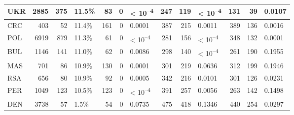 \begin{tabular}{l|r|r|l|r|r|l|r|r|l|r|r|l}
\hline
UKR & 2885 & 375 & 11.5\% & 83 & 0 & < 10\textsuperscript{--4} & 247 & 119 & < 10\textsuperscript{--4} & 131 & 39 & 0.0107\\
\hline
CRC & 403 & 52 & 11.4\% & 161 & 0 & 0.0001 & 387 & 215 & 0.0011 & 389 & 136 & 0.0016\\
\hline
POL & 6919 & 879 & 11.3\% & 61 & 0 & < 10\textsuperscript{--4} & 281 & 156 & < 10\textsuperscript{--4} & 348 & 132 & 0.0001\\
\hline
BUL & 1146 & 141 & 11.0\% & 62 & 0 & 0.0086 & 298 & 140 & < 10\textsuperscript{--4} & 261 & 190 & 0.1955\\
\hline
MAS & 701 & 86 & 10.9\% & 130 & 0 & 0.0001 & 301 & 219 & 0.0636 & 312 & 199 & 0.1946\\
\hline
RSA & 656 & 80 & 10.9\% & 92 & 0 & 0.0005 & 342 & 216 & 0.0101 & 301 & 126 & 0.0231\\
\hline
PER & 1049 & 123 & 10.5\% & 123 & 0 & < 10\textsuperscript{--4} & 391 & 257 & 0.0056 & 263 & 142 & 0.1498\\
\hline
DEN & 3738 & 57 & 1.5\% & 54 & 0 & 0.0735 & 475 & 418 & 0.1346 & 440 & 254 & 0.0297\\
\hline
\end{tabular}
